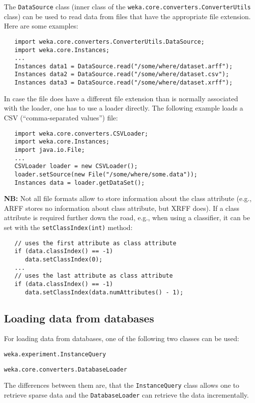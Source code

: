 The \texttt{DataSource} class (inner class of the
\texttt{weka.core.converters.ConverterUtils} class) can be used to read data
from files that have the appropriate file extension. Here are some examples:
\begin{verbatim}
   import weka.core.converters.ConverterUtils.DataSource;
   import weka.core.Instances;
   ...
   Instances data1 = DataSource.read("/some/where/dataset.arff");
   Instances data2 = DataSource.read("/some/where/dataset.csv");
   Instances data3 = DataSource.read("/some/where/dataset.xrff");
\end{verbatim}
In case the file does have a different file extension than is normally
associated with the loader, one has to use a loader directly. The following
example loads a CSV (``comma-separated values'') file:
\begin{verbatim}
   import weka.core.converters.CSVLoader;
   import weka.core.Instances;
   import java.io.File;
   ...
   CSVLoader loader = new CSVLoader();
   loader.setSource(new File("/some/where/some.data"));
   Instances data = loader.getDataSet();
\end{verbatim}
\textbf{NB:} Not all file formats allow to store information about the class
attribute (e.g., ARFF stores no information about class attribute, but XRFF
does). If a class attribute is required further down the road, e.g., when using
a classifier, it can be set with the \texttt{setClassIndex(int)} method:
\begin{verbatim}
   // uses the first attribute as class attribute
   if (data.classIndex() == -1)
      data.setClassIndex(0);
   ...
   // uses the last attribute as class attribute
   if (data.classIndex() == -1)
      data.setClassIndex(data.numAttributes() - 1);
\end{verbatim}

\subsection{Loading data from databases}
For loading data from databases, one of the following two classes can be used:
\begin{tight_itemize}
	\item \texttt{weka.experiment.InstanceQuery}
	\item \texttt{weka.core.converters.DatabaseLoader}
\end{tight_itemize}
The differences between them are, that the \texttt{InstanceQuery} class allows
one to retrieve sparse data and the \texttt{DatabaseLoader} can retrieve the
data incrementally. \\

